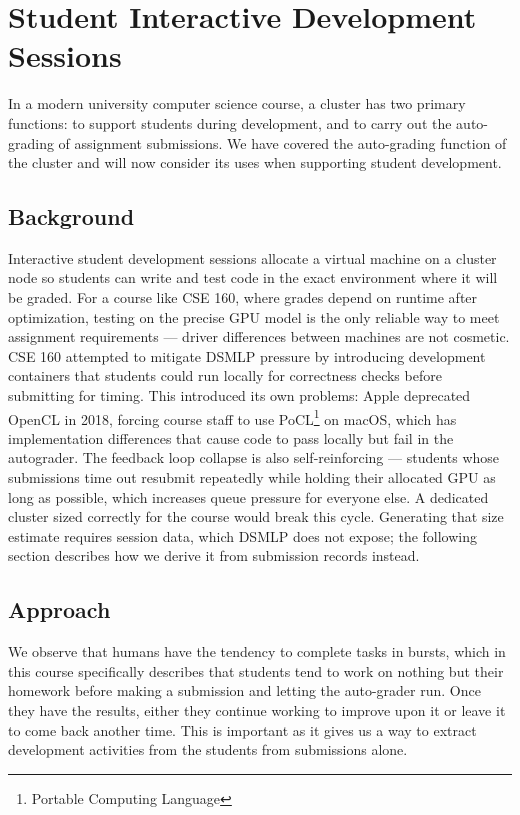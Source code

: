 \documentclass[acmlarge]{acmart}
\begin{document}
\section{Student Interactive Development Sessions}

In a modern university computer science course, a cluster has two primary functions: to support students during development, and to carry out the auto-grading of assignment submissions. We have covered the auto-grading function of the cluster and will now consider its uses when supporting student development. 

\subsection{Background}

Interactive student development sessions allocate a virtual machine on a cluster node so students can write and test code in the exact environment where it will be graded. For a course like CSE 160, where grades depend on runtime after optimization, testing on the precise GPU model is the only reliable way to meet assignment requirements --- driver differences between machines are not cosmetic. CSE 160 attempted to mitigate DSMLP pressure by introducing development containers that students could run locally for correctness checks before submitting for timing. This introduced its own problems: Apple deprecated OpenCL in 2018, forcing course staff to use PoCL\footnote{Portable Computing Language} on macOS, which has implementation differences that cause code to pass locally but fail in the autograder. The feedback loop collapse is also self-reinforcing --- students whose submissions time out resubmit repeatedly while holding their allocated GPU as long as possible, which increases queue pressure for everyone else. A dedicated cluster sized correctly for the course would break this cycle. Generating that size estimate requires session data, which DSMLP does not expose; the following section describes how we derive it from submission records instead.

\subsection{Approach}

We observe that humans have the tendency to complete tasks in bursts, which in this course specifically describes that students tend to work on nothing but their homework before making a submission and letting the auto-grader run. Once they have the results, either they continue working to improve upon it or leave it to come back another time. This is important as it gives us a way to extract development activities from the students from submissions alone.
\end{document}
